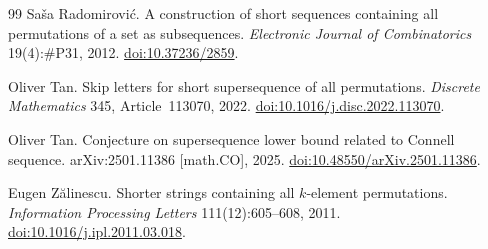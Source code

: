 \documentclass[11pt]{article}
\begin{document}
\begin{thebibliography}{99}
Sa\v{s}a Radomirovi\'c.
A construction of short sequences containing all permutations of a set as subsequences.
\emph{Electronic Journal of Combinatorics} 19(4):\#P31, 2012.
\href{https://doi.org/10.37236/2859}{doi:10.37236/2859}.

Oliver Tan.
Skip letters for short supersequence of all permutations.
\emph{Discrete Mathematics} 345, Article~113070, 2022.
\href{https://doi.org/10.1016/j.disc.2022.113070}{doi:10.1016/j.disc.2022.113070}.

Oliver Tan.
Conjecture on supersequence lower bound related to Connell sequence.
arXiv:2501.11386 [math.CO], 2025.
\href{https://doi.org/10.48550/arXiv.2501.11386}{doi:10.48550/arXiv.2501.11386}.

Eugen Z\u{a}linescu.
Shorter strings containing all $k$-element permutations.
\emph{Information Processing Letters} 111(12):605--608, 2011.
\href{https://doi.org/10.1016/j.ipl.2011.03.018}{doi:10.1016/j.ipl.2011.03.018}.
\end{thebibliography}
\end{document}
